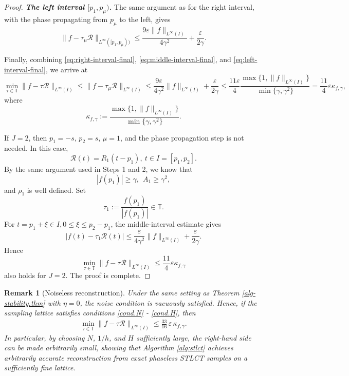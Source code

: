 \documentclass[11pt, reqno]{amsart}
\newtheorem{remark}[theorem]{Remark}%
\numberwithin{equation}{section}
\begin{document}
\begin{proof}
\medskip
\noindent
\emph{\textbf{The left interval $[p_1, p_{\mu})$.}} 
The same argument as for the right interval, with the phase propagating  from $p_\mu$ to the left,  gives
\begin{equation}\label{eq:left-interval-final}
\|f-\tau_\mu\mathcal R\|_{L^\infty([p_1,p_\mu))}
\le \frac{9\varepsilon\|f\|_{L^\infty(I)}}{4\gamma^2} + \frac{\varepsilon}{2\gamma}.
\end{equation}

Finally, combining \eqref{eq:right-interval-final}, \eqref{eq:middle-interval-final}, and \eqref{eq:left-interval-final}, we arrive at    
\begin{equation*}
    \min_{\tau\in\mathbb T}\|f-\tau\mathcal R\|_{L^\infty(I)} \le
  \|f-\tau_\mu\mathcal R\|_{L^\infty(I)} \le \frac{9\varepsilon}{4\gamma^2}\|f\|_{L^\infty(I)}+\frac{\varepsilon}{2\gamma} \le \frac{11\varepsilon}{4}\frac{\max\{1,\|f\|_{L^\infty(I)}\}}{\min\{\gamma,\gamma^2\}} = \frac{11}{4} \varepsilon \kappa_{f,\gamma},  
\end{equation*}
where $$ \kappa_{f,\gamma}:=\frac{\max\{1,\|f\|_{L^\infty(I)}\}}{\min\{\gamma,\gamma^2\}}.$$

If $J=2$, then  $p_1=-s$, $p_2=s$, $\mu=1$, and the phase propagation step is not needed. In this case,
$$\mathcal R(t)=R_1(t-p_1), \  t\in I=[p_1,p_2].$$ 
By the same argument used in Steps 1 and 2, we  know that 
$$|f(p_1)|\ge \gamma, \ \  A_1\ge \gamma^2,$$
 and $\rho_1$  is well defined.  
  Set
$$ \tau_1:=\frac{f(p_1)}{|f(p_1)|}\in\mathbb T.$$
For $t=p_1+\xi\in I, 0\le \xi\le p_2-p_1$, the middle-interval estimate gives
$$ |f(t)-\tau_1\mathcal R(t)| \le \frac{\varepsilon}{4\gamma^2}\|f\|_{L^\infty(I)}
+\frac{\varepsilon}{2\gamma}. $$ 
Hence 
$$ \min_{\tau\in\mathbb T}\|f-\tau\mathcal R\|_{L^\infty(I)} \le \frac{11}{4}\varepsilon\kappa_{f,\gamma}$$
also holds for $J=2$. The proof is complete.

\end{proof}









\begin{remark}[Noiseless reconstruction]
    Under the same setting as Theorem \ref{alg-stability.thm} with $\eta = 0$, the noise condition is vacuously satisfied. Hence, if the sampling lattice satisfies conditions \eqref{cond.N} - \eqref{cond.H}, then 
    \begin{align*}
        \min_{\tau\in\mathbb{T}}\|f - \tau\mathcal{R}\|_{L^\infty(I)} \le \frac{33}{16}\,\varepsilon\,\kappa_{f,\gamma}.
    \end{align*}
    In particular, by choosing $N$, $1/h$, and $H$ sufficiently large, the right-hand side can be made arbitrarily small, showing that Algorithm \ref{alg:stlct} achieves arbitrarily accurate reconstruction from exact phaseless STLCT samples on a sufficiently fine lattice.
\end{remark}
\end{document}
